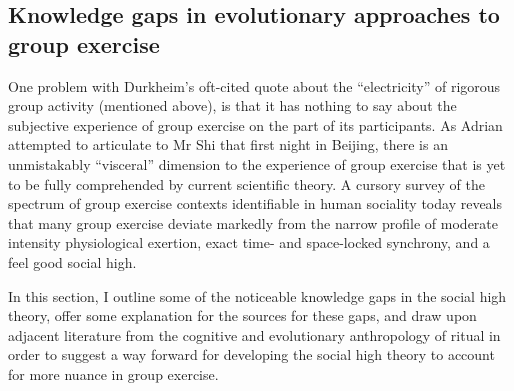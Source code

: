 \begin{CJK}{UTF8}{gbsn}
\section{Knowledge gaps in evolutionary approaches to group exercise}

One problem with Durkheim's oft-cited quote about the ``electricity'' of rigorous group activity (mentioned above), is that it has nothing to say about the subjective experience of group exercise on the part of its participants.  As Adrian attempted to articulate to Mr Shi that first night in Beijing, there is an unmistakably ``visceral'' dimension to the experience of group exercise that is yet to be fully comprehended by current scientific theory. A cursory survey of the spectrum of group exercise contexts identifiable in human sociality today reveals that many group exercise deviate markedly from the narrow profile of moderate intensity physiological exertion, exact time- and space-locked synchrony, and a feel good social high.

In this section, I outline some of the noticeable knowledge gaps in the social high theory, offer some explanation for the sources for these gaps, and draw upon adjacent literature from the cognitive and evolutionary anthropology of ritual in order to suggest a way forward for developing the social high theory to account for more nuance in group exercise.



\end{CJK}
